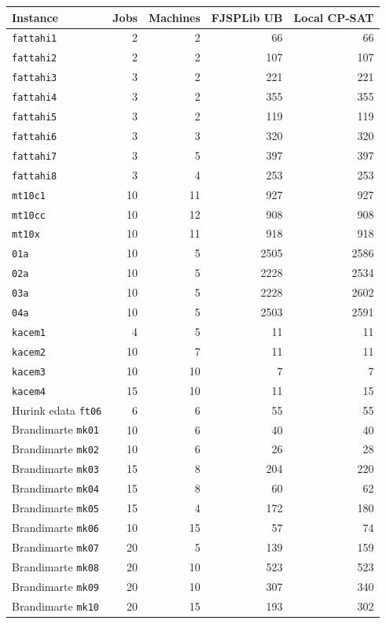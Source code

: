 ﻿\documentclass[11pt]{article}
\begin{document}
\begin{table}[h]
\centering
\begin{tabular}{lrrrr}
\toprule
Instance & Jobs & Machines & FJSPLib UB & Local CP-SAT \\
\midrule
\texttt{fattahi1} & 2 & 2 & 66 & 66 \\
\texttt{fattahi2} & 2 & 2 & 107 & 107 \\
\texttt{fattahi3} & 3 & 2 & 221 & 221 \\
\texttt{fattahi4} & 3 & 2 & 355 & 355 \\
\texttt{fattahi5} & 3 & 2 & 119 & 119 \\
\texttt{fattahi6} & 3 & 3 & 320 & 320 \\
\texttt{fattahi7} & 3 & 5 & 397 & 397 \\
\texttt{fattahi8} & 3 & 4 & 253 & 253 \\
\texttt{mt10c1} & 10 & 11 & 927 & 927 \\
\texttt{mt10cc} & 10 & 12 & 908 & 908 \\
\texttt{mt10x} & 10 & 11 & 918 & 918 \\
\texttt{01a} & 10 & 5 & 2505 & 2586 \\
\texttt{02a} & 10 & 5 & 2228 & 2534 \\
\texttt{03a} & 10 & 5 & 2228 & 2602 \\
\texttt{04a} & 10 & 5 & 2503 & 2591 \\
\texttt{kacem1} & 4 & 5 & 11 & 11 \\
\texttt{kacem2} & 10 & 7 & 11 & 11 \\
\texttt{kacem3} & 10 & 10 & 7 & 7 \\
\texttt{kacem4} & 15 & 10 & 11 & 15 \\
Hurink edata \texttt{ft06} & 6 & 6 & 55 & 55 \\
Brandimarte \texttt{mk01} & 10 & 6 & 40 & 40 \\
Brandimarte \texttt{mk02} & 10 & 6 & 26 & 28 \\
Brandimarte \texttt{mk03} & 15 & 8 & 204 & 220 \\
Brandimarte \texttt{mk04} & 15 & 8 & 60 & 62 \\
Brandimarte \texttt{mk05} & 15 & 4 & 172 & 180 \\
Brandimarte \texttt{mk06} & 10 & 15 & 57 & 74 \\
Brandimarte \texttt{mk07} & 20 & 5 & 139 & 159 \\
Brandimarte \texttt{mk08} & 20 & 10 & 523 & 523 \\
Brandimarte \texttt{mk09} & 20 & 10 & 307 & 340 \\
Brandimarte \texttt{mk10} & 20 & 15 & 193 & 302 \\
\bottomrule
\end{tabular}
\end{table}
\end{document}
